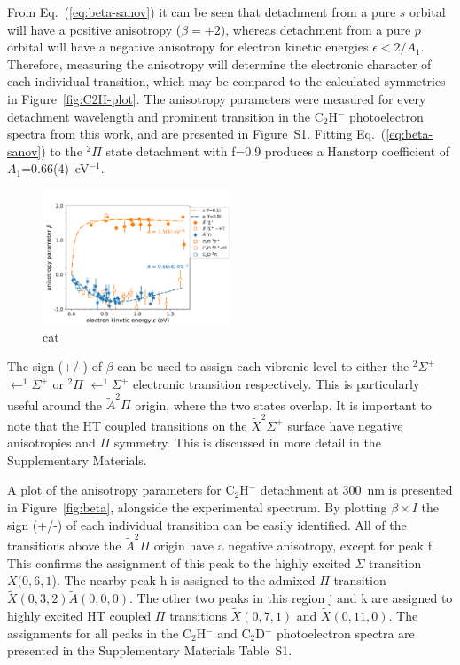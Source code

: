 \documentclass[journal=jpcafh,manuscript=article,layout=onecolumn, 12pt]{achemso}
\begin{document}
From Eq.~(\ref{eq:beta-sanov}) it can be seen that detachment from a pure $s$ orbital will have a positive anisotropy ($\beta=+2$), whereas detachment from a pure $p$ orbital will have a negative anisotropy for electron kinetic energies $\epsilon < 2/A_1$. Therefore, measuring the anisotropy will determine the electronic character of each individual transition, which may be compared to the calculated symmetries in Figure~\ref{fig:C2H-plot}. The anisotropy parameters were measured for every detachment wavelength and prominent transition in the C$_2$H$^-$ photoelectron spectra from this work, and are presented in Figure~S1. Fitting Eq.~(\ref{eq:beta-sanov}) to the $^2\Pi$ state detachment with f=0.9 produces a Hanstorp coefficient of $A_1$=0.66(4)~eV$^{-1}$. 

\begin{figure}[th!]
	\includegraphics[width=0.5\textwidth]{figures/PAD.pdf}
	\caption{cat}
	\label{fig:S1}
\end{figure}

The sign (+/-) of $\beta$ can be used to assign each vibronic level to either the $^2\Sigma^+$ $\leftarrow^1\Sigma^+$ or $^2\Pi$ $\leftarrow^1\Sigma^+$ electronic transition respectively. This is particularly useful around the $\tilde{A} ^2\Pi$ origin, where the two states overlap. It is important to note that the HT coupled transitions on the $\tilde{X} ^2\Sigma^+$ surface have negative anisotropies and $\Pi$ symmetry. This is discussed in more detail in the Supplementary Materials.

A plot of the anisotropy parameters for C$_2$H$^-$ detachment at 300~nm is presented in Figure~\ref{fig:beta}, alongside the experimental spectrum. By plotting $\beta\times I$ the sign (+/-) of each individual transition can be easily identified. All of the transitions above the $\tilde{A} ^2\Pi$ origin have a negative anisotropy, except for peak f. This confirms the assignment of this peak to the highly excited $\Sigma$ transition $\tilde{X}(0,6,1$). The nearby peak h is assigned to the admixed $\Pi$ transition $\tilde{X}(0,3,2)\tilde{A}(0,0,0)$. The other two peaks in this region j and k are assigned to highly excited HT coupled $\Pi$ transitions $\tilde{X}(0,7,1)$ and $\tilde{X}(0,11,0)$. The assignments for all peaks in the C$_2$H$^-$ and C$_2$D$^-$ photoelectron spectra are presented in the Supplementary Materials Table~S1.
\end{document}
